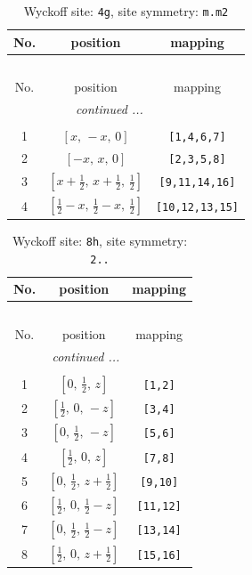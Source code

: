 \documentclass[fleqn,8pt]{jsarticle}
\begin{document}
\renewcommand{\arraystretch}{1.2}
\begin{longtable}{ccc}
\caption{Wyckoff site: {\tt 4g}, site symmetry: {\tt m.m2}}
 \\
 \hline \hline
No. & position & mapping \\ \hline \endfirsthead

\multicolumn{2}{l}{\tablename\ \thetable{}} \\
 \hline \hline
No. & position & mapping \\ \hline \endhead

 \hline \hline
\multicolumn{2}{r}{\footnotesize\it continued ...} \\ \endfoot

 \hline \hline
\multicolumn{2}{r}{} \\ \endlastfoot

1 & $\left[ x,\, - x,\, 0 \right]$ & {\tt [1,4,6,7]} \\ \hline
2 & $\left[ - x,\, x,\, 0 \right]$ & {\tt [2,3,5,8]} \\ \hline
3 & $\left[ x + \frac{1}{2},\, x + \frac{1}{2},\, \frac{1}{2} \right]$ & {\tt [9,11,14,16]} \\ \hline
4 & $\left[ \frac{1}{2} - x,\, \frac{1}{2} - x,\, \frac{1}{2} \right]$ & {\tt [10,12,13,15]} \\
\end{longtable}
\renewcommand{\arraystretch}{1.2}
\begin{longtable}{ccc}
\caption{Wyckoff site: {\tt 8h}, site symmetry: {\tt 2..}}
 \\
 \hline \hline
No. & position & mapping \\ \hline \endfirsthead

\multicolumn{2}{l}{\tablename\ \thetable{}} \\
 \hline \hline
No. & position & mapping \\ \hline \endhead

 \hline \hline
\multicolumn{2}{r}{\footnotesize\it continued ...} \\ \endfoot

 \hline \hline
\multicolumn{2}{r}{} \\ \endlastfoot

1 & $\left[ 0,\, \frac{1}{2},\, z \right]$ & {\tt [1,2]} \\ \hline
2 & $\left[ \frac{1}{2},\, 0,\, - z \right]$ & {\tt [3,4]} \\ \hline
3 & $\left[ 0,\, \frac{1}{2},\, - z \right]$ & {\tt [5,6]} \\ \hline
4 & $\left[ \frac{1}{2},\, 0,\, z \right]$ & {\tt [7,8]} \\ \hline
5 & $\left[ 0,\, \frac{1}{2},\, z + \frac{1}{2} \right]$ & {\tt [9,10]} \\ \hline
6 & $\left[ \frac{1}{2},\, 0,\, \frac{1}{2} - z \right]$ & {\tt [11,12]} \\ \hline
7 & $\left[ 0,\, \frac{1}{2},\, \frac{1}{2} - z \right]$ & {\tt [13,14]} \\ \hline
8 & $\left[ \frac{1}{2},\, 0,\, z + \frac{1}{2} \right]$ & {\tt [15,16]} \\
\end{longtable}
\end{document}
